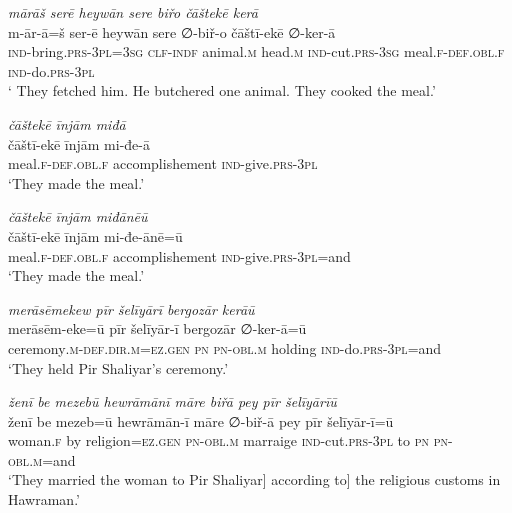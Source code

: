 \ea \label{ŽP.253}
\textit{mārāš serē heywān sere biřo čāštekē kerā} \\ 
\gll m-ār-ā=š ser-ē heywān sere ∅-biř-o čāštī-ekē ∅-ker-ā \\ 
 \textsc{ind-}bring\textsc{.prs}\textsc{-3pl}\textsc{=3sg} \textsc{clf}\textsc{-indf} animal\textsc{.m} head\textsc{.m} \textsc{ind-}cut\textsc{.prs}\textsc{-3sg} meal\textsc{.f}\textsc{-def}\textsc{.obl}\textsc{.f} \textsc{ind-}do\textsc{.prs}\textsc{-3pl} \\ 
\glt ` They fetched him. He butchered one animal. They cooked the meal.'
\z 
 
\ea \label{ŽP.254}
\textit{čāštekē īnjām miđā} \\ 
\gll čāštī-ekē īnjām mi-đe-ā \\ 
 meal\textsc{.f}\textsc{-def}\textsc{.obl}\textsc{.f} accomplishement \textsc{ind-}give\textsc{.prs}\textsc{-3pl} \\ 
\glt `They made the meal.'
\z 
 
\ea \label{ŽP.255}
\textit{čāštekē īnjām miđānēū} \\ 
\gll čāštī-ekē īnjām mi-đe-ānē=ū \\ 
 meal\textsc{.f}\textsc{-def}\textsc{.obl}\textsc{.f} accomplishement \textsc{ind-}give\textsc{.prs}\textsc{-3pl}=and \\ 
\glt `They made the meal.'
\z 
 
\ea \label{ŽP.256}
\textit{merāsēmekew pīr šelīyārī bergozār kerāū} \\ 
\gll merāsēm-eke=ū pīr šelīyār-ī bergozār ∅-ker-ā=ū \\ 
 ceremony\textsc{.m}\textsc{-def}\textsc{.dir}\textsc{.m}\textsc{\textsc{=ez.gen}} \textsc{pn} \textsc{pn}\textsc{-obl}\textsc{.m} holding \textsc{ind-}do\textsc{.prs}\textsc{-3pl}=and \\ 
\glt `They held Pir Shaliyar’s ceremony.'
\z 
 
\ea \label{ŽP.257}
\textit{ženī be mezebū hewrāmānī māre biřā pey pīr šelīyārīū} \\ 
\gll ženī be mezeb=ū hewrāmān-ī māre ∅-biř-ā pey pīr šelīyār-ī=ū \\ 
 woman\textsc{.f} by religion\textsc{\textsc{=ez.gen}} \textsc{pn}\textsc{-obl}\textsc{.m} marraige \textsc{ind-}cut\textsc{.prs}\textsc{-3pl} to \textsc{pn} \textsc{pn}\textsc{-obl}\textsc{.m}=and \\ 
\glt `They married the woman to Pir Shaliyar] according to] the religious customs in Hawraman.'
\z 
 
